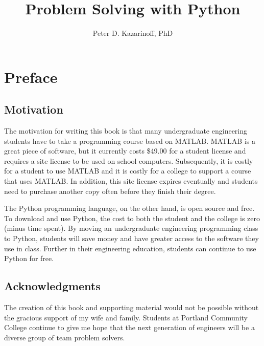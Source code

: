 \documentclass{book}
\title{Problem Solving with Python}
\author{Peter D. Kazarinoff, PhD}
\date{}
\begin{document}
    
    
    
    \maketitle
    
    
    \tableofcontents


    

    
        \chapter{Preface}\label{preface}
    




    
        \section{Motivation}\label{motivation}
    




    
        The motivation for writing this book is that many undergraduate
engineering students have to take a programming course based on MATLAB.
MATLAB is a great piece of software, but it currently costs \$49.00 for
a student license and requires a site license to be used on school
computers. Subsequently, it is costly for a student to use MATLAB and it
is costly for a college to support a course that uses MATLAB. In
addition, this site license expires eventually and students need to
purchase another copy often before they finish their degree.

The Python programming language, on the other hand, is open source and
free. To download and use Python, the cost to both the student and the
college is zero (minus time spent). By moving an undergraduate
engineering programming class to Python, students will save money and
have greater access to the software they use in class. Further in their
engineering education, students can continue to use Python for free.
    




    
        \section{Acknowledgments}\label{acknowledgments}
    




    
        The creation of this book and supporting material would not be possible
without the gracious support of my wife and family. Students at Portland
Community College continue to give me hope that the next generation of
engineers will be a diverse group of team problem solvers.
\end{document}

